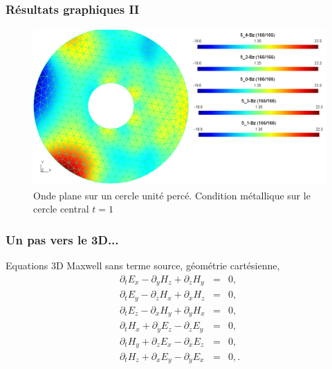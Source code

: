\documentclass[9pt]{beamer}
\begin{document}
\begin{frame}
\frametitle{Résultats graphiques II}
\begin{figure}
\centering
\includegraphics[height=6cm,keepaspectratio=true]{./fig/Fig2.png}
\caption{Onde plane sur un cercle unité percé. Condition métallique sur le cercle central $t=1$}
\end{figure}
\end{frame}




\begin{frame}
\frametitle{Un pas vers le 3D...}
Equations 3D Maxwell sans terme source, géométrie cartésienne,
\begin{eqnarray}
\partial_t E_x - \partial_y H_z + \partial_z H_y    &=& 0, \label{eq:3a}\\
\partial_t E_y - \partial_z H_x + \partial_x H_z    &=& 0, \label{eq:3b}\\
\partial_t E_z - \partial_x H_y + \partial_y H_x    &=& 0, \label{eq:3c}\\
\partial_t H_x + \partial_y E_z - \partial_z E_y    &=& 0, \label{eq:3d}\\
\partial_t H_y + \partial_z E_x - \partial_x E_z    &=& 0, \label{eq:3e}\\
\partial_t H_z + \partial_x E_y - \partial_y E_x    &=& 0, \label{eq:3f}.
\end{eqnarray}
\end{frame}
\end{document}
